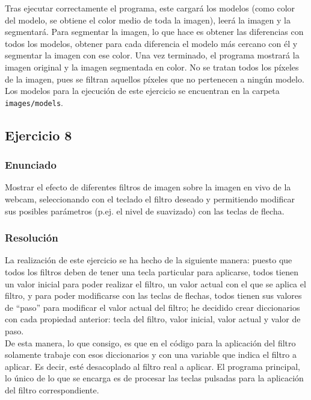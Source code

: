 \documentclass[a4paper,10pt,titlepage,oneside,openright]{book}
\begin{document}
Tras ejecutar correctamente el programa, este cargará los modelos (como color del modelo, se obtiene el color medio de toda la imagen), leerá la imagen y la segmentará. Para segmentar la imagen, lo que hace es obtener las diferencias con todos los modelos, obtener para cada diferencia el modelo más cercano con él y segmentar la imagen con ese color. Una vez terminado, el programa mostrará la imagen original y la imagen segmentada en color. No se tratan todos los píxeles de la imagen, pues se filtran aquellos píxeles que no pertenecen a ningún modelo. \\

Los modelos para la ejecución de este ejercicio se encuentran en la carpeta \texttt{images/models}.


\medskip
\subsection{Ejercicio 8}

\subsubsection*{Enunciado}
Mostrar el efecto de diferentes filtros de imagen sobre la imagen en vivo de la webcam, seleccionando con el teclado el filtro deseado y permitiendo modificar sus posibles parámetros (p.ej. el nivel de suavizado) con las teclas de flecha.

\subsubsection*{Resolución}
La realización de este ejercicio se ha hecho de la siguiente manera: puesto que todos los filtros deben de tener una tecla particular para aplicarse, todos tienen un valor inicial para poder realizar el filtro, un valor actual con el que se aplica el filtro, y para poder modificarse con las teclas de flechas, todos tienen sus valores de ``paso'' para modificar el valor actual del filtro; he decidido crear diccionarios con cada propiedad anterior: tecla del filtro, valor inicial, valor actual y valor de paso. \\

De esta manera, lo que consigo, es que en el código para la aplicación del filtro solamente trabaje con esos diccionarios y con una variable que indica el filtro a aplicar. Es decir, esté desacoplado al filtro real a aplicar. El programa principal, lo único de lo que se encarga es de procesar las teclas pulsadas para la aplicación del filtro correspondiente. \\
\end{document}
